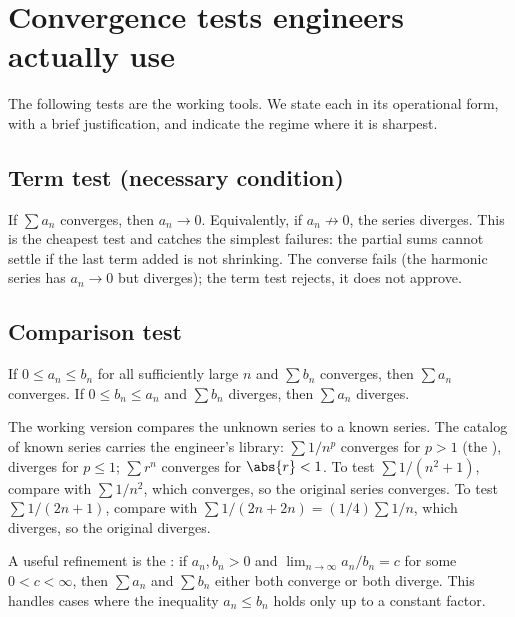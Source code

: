 \section{Convergence tests engineers actually use}

The following tests are the working tools. We state each in its
operational form, with a brief justification, and indicate the regime
where it is sharpest.

\subsection{Term test (necessary condition)}

If $\sum a_{n}$ converges, then $a_{n} \to 0$. Equivalently, if
$a_{n} \not\to 0$, the series diverges. This is the cheapest test and
catches the simplest failures: the partial sums cannot settle if the
last term added is not shrinking. The converse fails (the harmonic
series has $a_{n} \to 0$ but diverges); the term test rejects, it does
not approve.

\subsection{Comparison test}

If $0 \leq a_{n} \leq b_{n}$ for all sufficiently large $n$ and
$\sum b_{n}$ converges, then $\sum a_{n}$ converges. If $0 \leq b_{n}
\leq a_{n}$ and $\sum b_{n}$ diverges, then $\sum a_{n}$ diverges.

The working version compares the unknown series to a known series. The
catalog of known series carries the engineer's library: $\sum 1/n^{p}$
converges for $p > 1$ (the ), diverges for $p \leq 1$;
$\sum r^{n}$ converges for $\abs{r} < 1$. To test $\sum 1/(n^{2} + 1)$,
compare with $\sum 1/n^{2}$, which converges, so the original series
converges. To test $\sum 1/(2n + 1)$, compare with $\sum 1/(2n + 2n) =
(1/4) \sum 1/n$, which diverges, so the original diverges.

A useful refinement is the : if
$a_{n}, b_{n} > 0$ and $\lim_{n \to \infty} a_{n}/b_{n} = c$ for some
$0 < c < \infty$, then $\sum a_{n}$ and $\sum b_{n}$ either both
converge or both diverge. This handles cases where the inequality
$a_{n} \leq b_{n}$ holds only up to a constant factor.

